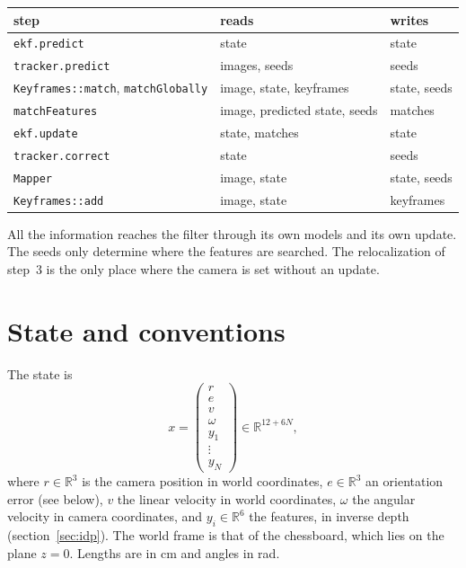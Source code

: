 \documentclass[11pt]{article}
\newcommand{\R}{\mathbb{R}}
\begin{document}
\begin{center}
\begin{tabular}{lll}
  step & reads & writes \\
  \hline
  \texttt{ekf.predict} & state & state \\
  \texttt{tracker.predict} & images, seeds & seeds \\
  \texttt{Keyframes::match}, \texttt{matchGlobally} & image, state, keyframes & state, seeds \\
  \texttt{matchFeatures} & image, predicted state, seeds & matches \\
  \texttt{ekf.update} & state, matches & state \\
  \texttt{tracker.correct} & state & seeds \\
  \texttt{Mapper} & image, state & state, seeds \\
  \texttt{Keyframes::add} & image, state & keyframes \\
\end{tabular}
\end{center}

All the information reaches the filter through its own models and its own update. The seeds only
determine where the features are searched. The relocalization of step~3 is the only place where the camera is set
without an update.

\section{State and conventions}
\label{sec:state}

The state is
\begin{equation}
  x = \begin{pmatrix} r \\ e \\ v \\ \omega \\ y_1 \\ \vdots \\ y_N \end{pmatrix} \in \R^{12 + 6N},
\end{equation}
where $r \in \R^3$ is the camera position in world coordinates, $e \in \R^3$ an orientation error
(see below), $v$ the linear velocity in world coordinates, $\omega$ the angular velocity in camera
coordinates, and $y_i \in \R^6$ the features, in inverse depth (section~\ref{sec:idp}). The world
frame is that of the chessboard, which lies on the plane $z = 0$. Lengths are in cm and angles in
rad.
\end{document}
